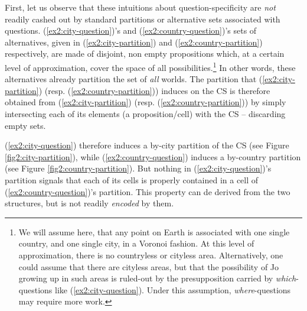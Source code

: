 First, let us observe that these intuitions about question-specificity are \textit{not} readily cashed out by standard partitions or alternative sets associated with questions. (\ref{ex2:city-question})'s and (\ref{ex2:country-question})'s sets of alternatives, given in (\ref{ex2:city-partition}) and (\ref{ex2:country-partition}) respectively, are made of disjoint, non empty propositions which, at a certain level of approximation, cover the space of all possibilities.\footnote{We will assume here, that any point on Earth is associated with one single country, and one single city, in a Voronoi fashion. At this level of approximation, there is no countryless or cityless area. Alternatively, one could assume that there are cityless areas, but that the possibility of Jo growing up in such areas is ruled-out by the presupposition carried by \textit{which}-questions like (\ref{ex2:city-question}). Under this assumption, \textit{where}-questions may require more work.} In other words, these alternatives already partition the set of \textit{all} worlds. The partition that (\ref{ex2:city-partition}) (resp. (\ref{ex2:country-partition})) induces on the CS is therefore obtained from (\ref{ex2:city-partition}) (resp. (\ref{ex2:country-partition})) by simply intersecting each of its elements (a proposition/cell) with the CS -- discarding empty sets.

\begin{exe}
	\ex 
	\begin{xlist}
		\label{ex2:city-partition}
		\label{ex2:country-partition}
	\end{xlist}
\end{exe}

(\ref{ex2:city-question}) therefore induces a by-city partition of the CS (see Figure \ref{fig2:city-partition}), while (\ref{ex2:country-question}) induces a by-country partition (see Figure \ref{fig2:country-partition}). But nothing in (\ref{ex2:city-question})'s partition signals that each of its cells is properly contained in a cell of (\ref{ex2:country-question})'s partition. This property can de derived from the two structures, but is not readily \textit{encoded} by them.



